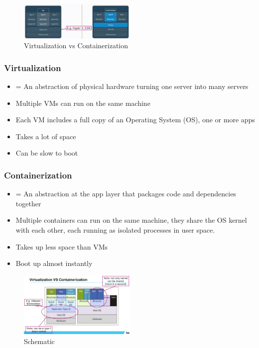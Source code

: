 \documentclass{article}
\begin{document}
\begin{figure}[H]
    \centering
    \includegraphics[width=0.5\textwidth]{virtualization-vs-containerization.png}
    \caption{Virtualization vs Containerization}
\end{figure}

\subsubsection{Virtualization}

\begin{itemize}
    \item = An abstraction of physical hardware turning one server into many servers
    \item Multiple VMs can run on the same machine
    \item Each VM includes a full copy of an Operating System (OS), one or more apps
    \item Takes a lot of space
    \item Can be slow to boot
\end{itemize}

\subsubsection{Containerization}

\begin{itemize}
    \item = An abstraction at the app layer that packages code and dependencies together
    \item Multiple containers can run on the same machine, they share the OS kernel with each other, each running as isolated processes in user space.
    \item Takes up less space than VMs
    \item Boot up almost instantly
\end{itemize}

\begin{figure}[H]
    \centering
    \includegraphics[width=0.5\textwidth]{virtualization-vs-containerization2.png}
    \caption{Schematic }
\end{figure}
\end{document}
